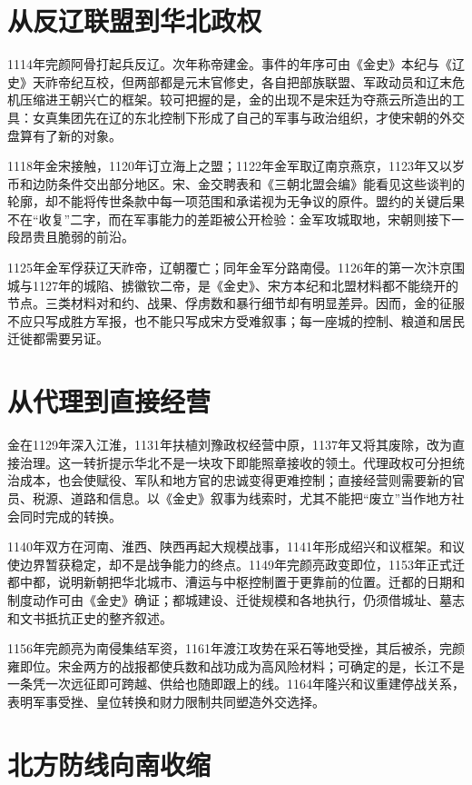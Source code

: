 \section{从反辽联盟到华北政权}

1114年完颜阿骨打起兵反辽。次年称帝建金。事件的年序可由《金史》本纪与《辽史》天祚帝纪互校，但两部都是元末官修史，各自把部族联盟、军政动员和辽末危机压缩进王朝兴亡的框架。较可把握的是，金的出现不是宋廷为夺燕云所造出的工具：女真集团先在辽的东北控制下形成了自己的军事与政治组织，才使宋朝的外交盘算有了新的对象。

1118年金宋接触，1120年订立海上之盟；1122年金军取辽南京燕京，1123年又以岁币和边防条件交出部分地区。宋、金交聘表和《三朝北盟会编》能看见这些谈判的轮廓，却不能将传世条款中每一项范围和承诺视为无争议的原件。盟约的关键后果不在“收复”二字，而在军事能力的差距被公开检验：金军攻城取地，宋朝则接下一段昂贵且脆弱的前沿。

1125年金军俘获辽天祚帝，辽朝覆亡；同年金军分路南侵。1126年的第一次汴京围城与1127年的城陷、掳徽钦二帝，是《金史》、宋方本纪和北盟材料都不能绕开的节点。三类材料对和约、战果、俘虏数和暴行细节却有明显差异。因而，金的征服不应只写成胜方军报，也不能只写成宋方受难叙事；每一座城的控制、粮道和居民迁徙都需要另证。

\section{从代理到直接经营}

金在1129年深入江淮，1131年扶植刘豫政权经营中原，1137年又将其废除，改为直接治理。这一转折提示华北不是一块攻下即能照章接收的领土。代理政权可分担统治成本，也会使赋役、军队和地方官的忠诚变得更难控制；直接经营则需要新的官员、税源、道路和信息。以《金史》叙事为线索时，尤其不能把“废立”当作地方社会同时完成的转换。

1140年双方在河南、淮西、陕西再起大规模战事，1141年形成绍兴和议框架。和议使边界暂获稳定，却不是战争能力的终点。1149年完颜亮政变即位，1153年正式迁都中都，说明新朝把华北城市、漕运与中枢控制置于更靠前的位置。迁都的日期和制度动作可由《金史》确证；都城建设、迁徙规模和各地执行，仍须借城址、墓志和文书抵抗正史的整齐叙述。

1156年完颜亮为南侵集结军资，1161年渡江攻势在采石等地受挫，其后被杀，完颜雍即位。宋金两方的战报都使兵数和战功成为高风险材料；可确定的是，长江不是一条凭一次远征即可跨越、供给也随即跟上的线。1164年隆兴和议重建停战关系，表明军事受挫、皇位转换和财力限制共同塑造外交选择。

\section{北方防线向南收缩}

